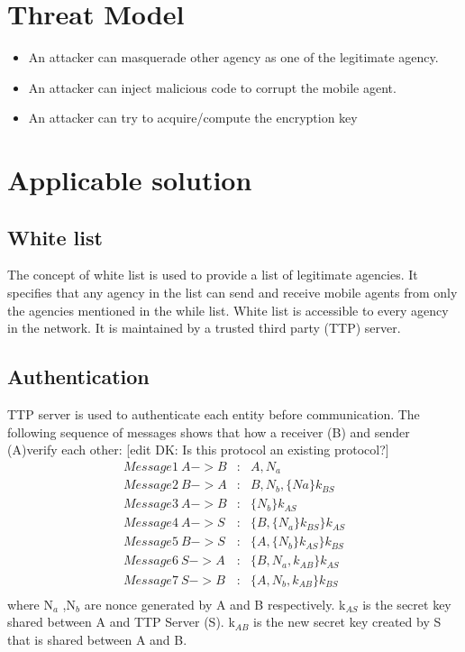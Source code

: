 \documentclass[letterpaper]{article}
\begin{document}
\section{Threat Model}
\begin{itemize}
\item An attacker can masquerade other agency as one of the legitimate agency. 
\item An attacker can inject malicious code to corrupt the mobile agent.
\item An attacker can try to acquire/compute the encryption key
\end{itemize}

\section{Applicable solution}
\subsection{White list}
The concept of white list is used to provide a list of legitimate agencies. It
specifies that any agency in the list can send and receive mobile agents from
only the agencies mentioned in the while list. White list is accessible to
every agency in the network. It is maintained by a trusted third party (TTP)
server. 

\subsection{Authentication}
TTP server is used to authenticate each entity before communication. The
following sequence of messages shows that how a receiver (B) and sender (A)verify each
 other: [edit DK: Is this protocol an existing protocol?]
\begin{eqnarray*}
Message 1 ~ A -> B &:&  A, N_a \\
Message 2 ~ B -> A &:&  B, N_b, \{ Na \}k_{BS} \\
Message 3 ~ A -> B &:&  \{ N_b \}k_{AS} \\
Message 4 ~ A -> S &:&  \{ B, \{ N_a \}k_{BS} \} k_{AS} \\
Message 5 ~ B -> S &:&  \{ A, \{ N_b \}k_{AS} \}k_{BS} \\
Message 6 ~ S -> A &:&  \{ B, N_a, k_{AB} \} k_{AS} \\
Message 7 ~ S -> B &:&  \{ A, N_b, k_{AB} \}k_{BS} \\
\end{eqnarray*}
where N$_a$ ,N$_b$ are nonce generated by A and B respectively. k$_{AS}$ is the 
secret key shared between A and TTP Server (S). k$_{AB}$ is the new secret key 
created by S that is shared between A and B.
\end{document}
